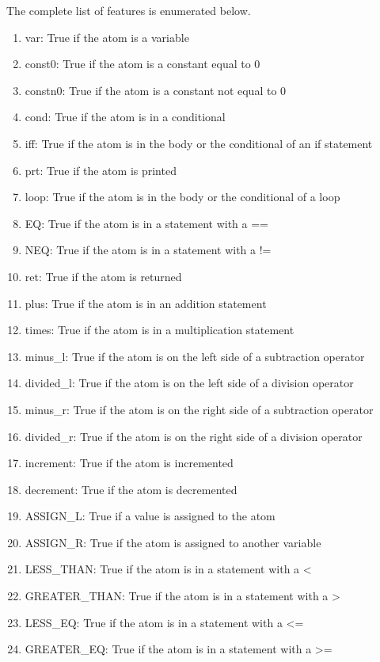 \documentclass[conference]{IEEEtran}
\begin{document}
The complete list of features is enumerated below.
\begin{enumerate}
\item var: True if the atom is a variable
\item const0: True if the atom is a constant equal to 0
\item constn0: True if the atom is a constant not equal to 0

\item cond: True if the atom is in a conditional
\item iff: True if the atom is in the body or the conditional of an if statement
\item prt: True if the atom  is printed
\item loop: True if the atom is in the body or the conditional of a loop
\item EQ: True if the atom is in a statement with a ==
\item NEQ: True if the atom is in a statement with a !=

\item ret: True if the atom is returned

\item plus: True if the atom is in an addition statement
\item times: True if the atom is in a multiplication statement
\item minus\_l: True if the atom is on the left side of a subtraction operator
\item divided\_l: True if the atom is on the left side of a division operator
\item minus\_r: True if the atom is on the right side of a subtraction operator
\item divided\_r: True if the atom is on the right side of a division operator
\item increment: True if the atom is incremented
\item decrement: True if the atom is decremented
\item ASSIGN\_L: True if a value is assigned to the atom 
\item ASSIGN\_R: True if the atom is assigned to another variable

\item LESS\_THAN: True if the atom is in a statement with a \textless
\item GREATER\_THAN: True if the atom is in a statement with a \textgreater
\item LESS\_EQ: True if the atom is in a statement with a \textless =
\item GREATER\_EQ: True if the atom is in a statement with a \textgreater =
\end{enumerate}
 
\end{document}

